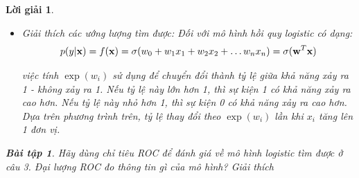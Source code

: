 \documentclass[14pt, a4paper]{article}
\theoremstyle{sltheorem}
\newtheorem{baitap}{Bài tập}
\theoremstyle{soltheorem}
\newtheorem*{loigiai}{Lời giải}
\begin{document}
\begin{loigiai}
\begin{itemize}
        \begin{itemize}
            \item Mô hình logistic yêu cầu biến phụ thuộc có dạng nhị phân hoặc biến phụ thuộc là dạng định danh.
            \item Mô hình logistic yêu cầu các quan sát phải độc lập với nhau. Nghĩa là mỗi ví dụ học không phụ thuộc vào bất kỳ ví dụ học nào khác trong tập dữ liệu.
            Nhưng giả định này thường hay bị vi phạm do có nhiều điểm dữ liệu được đo trong một khoảng thời gian, không gian gần nhau dẫn đến các quan sát có sự liên quan nhất định với nhau.
            \item Mô hình logistic đòi hỏi phải có ít hoặc không có đa cộng tuyến giữa các biến độc lập.
            Điều này có nghĩa là các biến độc lập không nên có tương quan quá cao với nhau.
            \item Không có các điểm ngoại lai: hồi quy logistic rất nhạy cảm với các giá trị ngoại lai hoặc các điểm dữ liệu có giá trị lớn hoặc nhỏ bất thường.
            \item Mô hình logistic giả định mối quan hệ của hàm log cơ số tự nhiên của tỷ số xác suất xảy ra - không xảy ra phụ thuộc tuyến tính vào các biến độc lập.
            \item Mô hình logistic cần một số lượng các ví dụ học đủ lớn. Số ví dụ học cần ít nhất là khoảng 10 lần số biến độc lập được đưa vào mô hình.
        \end{itemize}

        \item Giải thích các ướng lượng tìm được:
        Đối với mô hình hồi quy logistic có dạng:
        \begin{equation*}
            p(y \vert \bold{x}) = f(\bold{x}) = \sigma(w_0 + w_1 x_1 + w_2 x_2 + \dots w_n x_n) = \sigma(\bold{w}^T \bold{x})
        \end{equation*}

        việc tính $\exp(w_i)$ sử dụng để chuyển đổi thành tỷ lệ giữa khả năng xảy ra 1 - không xảy ra 1.
        Nếu tỷ lệ này lớn hơn 1, thì sự kiện 1 có khả năng xảy ra cao hơn.
        Nếu tỷ lệ này nhỏ hơn 1, thì sự kiện 0 có khả năng xảy ra cao hơn.
        Dựa trên phương trình trên, tỷ lệ thay đổi theo $\exp(w_i)$ lần khi $x_i$ tăng lên 1 đơn vị.

    \end{itemize}

    \begin{baitap}
        Hãy dùng chỉ tiêu ROC để đánh giá về mô hình logistic tìm được ở câu 3. Đại lượng ROC đo thông tin gì của mô hình? Giải thích
    \end{baitap}


\end{loigiai}
\end{document}
